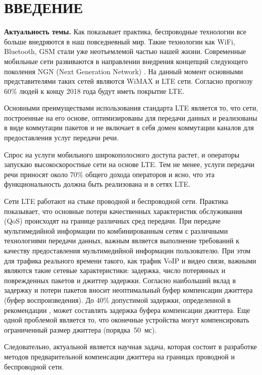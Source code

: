 \chapter*{ВВЕДЕНИЕ}							%

\textbf{Актуальность темы.} Как показывает практика, беспроводные технологии все больше внедряются в наш повседневный мир. Такие технологии как WiFi, Bluetooth, GSM стали уже неотъемлемой частью нашей жизни. 
Современные мобильные сети развиваются в направлении внедрения концепций следующего поколения NGN (Next Generation Network) \cite{zacon:net,zacon:tele}. На данный момент основными представителями таких сетей являются WiMAX и LTE сети.
Согласно прогнозу \cite{ericsson} 60\% людей к концу 2018 года будут иметь покрытие LTE.


Основными преимуществами использования стандарта LTE является то, что сети, построенные на его основе, оптимизированы для передачи данных и реализованы в виде коммутации пакетов 
и не включает в себя домен коммутации каналов для предоставления услуг передачи речи.

Спрос на услуги мобильного широкополосного доступа растет, и операторы запускаю высокоскоростные сети на основе LTE. 
Тем не менее, услуги передачи речи приносят около 70\% общего дохода операторов и ясно, что эта функциональность должна быть реализована и в сетях LTE.

Сети LTE работают на стыке проводной и беспроводной сети. %
Практика показывает, что основные потери качественных характеристик обслуживания (QoS) происходят на границе различных сред передачи.
При передаче мультимедийной информации по комбинированным сетям с различными технологиями передачи данных, важным является выполнение требований к качеству предоставления мультимедийной информации пользователю.
При этом для трафика реального времени такого, как трафик VoIP и видео связи, важными являются такие сетевые характеристики:
задержка, число потерянных и поврежденных пакетов и джиттер задержки.
Согласно \cite{rokovoy} наибольший вклад в задержку и потери пакетов вносит неоптимальный буфер компенсации джиттера (буфер воспроизведения). До 40\% допустимой задержки, определенной в рекомендации \cite{G114}, может составлять задержка буфера компенсации джиттера.
Еще одной проблемой является то, что оконечные устройства могут компенсировать ограниченный размер джиттера (порядка~50~мс).

Следовательно, актуальной является научная задача, которая состоит в разработке методов предварительной компенсации джиттера на границах проводной и беспроводной сети.


